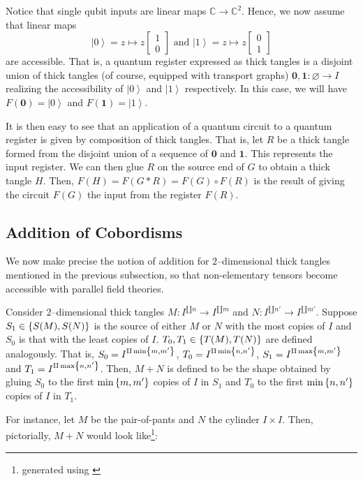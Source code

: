 \documentclass{amsart}
\newcommand{\C}{\mathbb{C}}
\renewcommand{\to}[1][]{\stackrel{#1}{\longrightarrow}}
\renewcommand{\mapsto}{\longmapsto}
\newcommand{\curly}[1]{\left\{ #1 \right\}}
\newcommand{\set}[2][]{\ifthenelse{\equal{#1}{}}
                                  {\curly{#2}}
                                  {\curly{#1\ \textbf{:}\ #2}}}
\newcommand{\bmat}[1]{\begin{bmatrix} #1 \end{bmatrix}}
\newcommand{\ket}[1]{\left| #1 \right\rangle}
\numberwithin{thm}{section}
\theoremstyle{definition}
\begin{document}
Notice that single qubit inputs are linear maps $\C \to \C^2$. Hence, we now
assume that linear maps
\[
  \ket{0} = z \mapsto z\bmat{1 \\ 0} \text{ and }
  \ket{1} = z \mapsto z \bmat{0 \\ 1}
\]
are accessible. That is, a quantum register expressed as thick tangles is a
disjoint union of thick tangles (of course, equipped with transport graphs)
$\mathbf{0}, \mathbf{1} : \varnothing \to I$ realizing the accessibility of
$\ket{0}$ and $\ket{1}$ respectively. In this case, we will have
$F(\mathbf{0}) = \ket{0}$ and $F(\mathbf{1}) = \ket{1}$.

It is then easy to see that an application of a quantum circuit to a quantum
register is given by composition of thick tangles. That is, let $R$ be a thick
tangle formed from the disjoint union of a sequence of $\mathbf{0}$ and
$\mathbf{1}$. This represents the input register. We can then glue $R$ on the
source end of $G$ to obtain a thick tangle $H$. Then,
$F(H) = F(G * R) = F(G) \circ F(R)$ is the result of giving the circuit
$F(G)$ the input from the register $F(R)$.

%

\subsection{Addition of Cobordisms}

We now make precise the notion of addition for $2$--dimensional thick tangles
mentioned in the previous subsection, so that non-elementary tensors become
accessible with parallel field theories.

Consider $2$--dimensional thick tangles $M : I^{\amalg n} \to I^{\amalg m}$ and
$N : I^{\amalg n'} \to I^{\amalg m'}$. Suppose $S_1 \in \set{S(M), S(N)}$ is the
source of either $M$ or $N$ with the most copies of $I$ and $S_0$ is that with
the least copies of $I$. $T_0, T_1 \in \set{T(M), T(N)}$ are defined
analogously. That is, $S_0 = I^{\amalg \min\set{m, m'}}$,
$T_0 = I^{\amalg \min\set{n, n'}}$, $S_1 = I^{\amalg \max\set{m, m'}}$ and
$T_1 = I^{\amalg \max\set{n, n'}}$. Then, $M + N$ is defined to be the shape
obtained by gluing $S_0$ to the first $\min\set{m, m'}$ copies of $I$ in
$S_1$ and $T_0$ to the first $\min\set{n, n'}$ copies of $I$ in $T_1$.

For instance, let $M$ be the pair-of-pants and $N$ the cylinder $I \times I$.
Then, pictorially, $M + N$ would look like\footnote{generated using
\cite{Mathcha}}:
\end{document}

